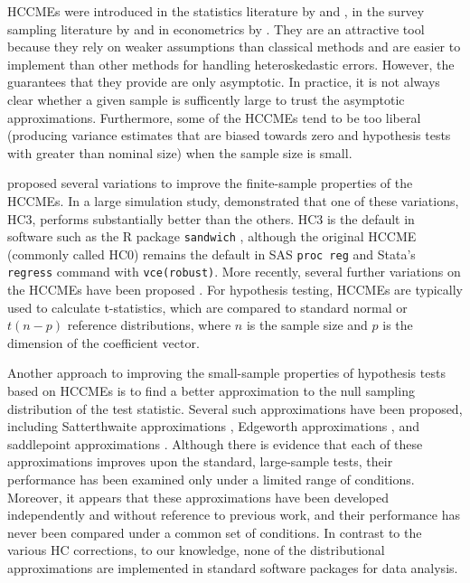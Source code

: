 \documentclass[12pt]{article}\usepackage[]{graphicx}\usepackage[]{color}
\begin{document}
HCCMEs were introduced in the statistics literature by \citet{Huber1967behavior} and \citet{Eicker1967limit}, in the survey sampling literature by and in econometrics by \citet{White1980heteroskedasticity}. They are an attractive tool because they rely on weaker assumptions than classical methods and are easier to implement than other methods for handling heteroskedastic errors. However, the guarantees that they provide are only asymptotic. In practice, it is not always clear whether a given sample is sufficently large to trust the asymptotic approximations. Furthermore, some of the HCCMEs tend to be too liberal (producing variance estimates that are biased towards zero and hypothesis tests with greater than nominal size) when the sample size is small. 

\citet{MacKinnon1985some} proposed several variations to improve the finite-sample properties of the HCCMEs. 
In a large simulation study, \citet{Long2000using} demonstrated that one of these variations, HC3, performs substantially better than the others.
HC3 is the default in software such as the R package \texttt{sandwich} \citep{Zeileis2004econometric}, although the original HCCME (commonly called HC0) remains the default in SAS \texttt{proc reg} and Stata's \texttt{regress} command with \texttt{vce(robust)}. 
More recently, several further variations on the HCCMEs have been proposed \citep{Cribari-Neto2004asymptotic, Cribari-Neto2007inference, Cribari-Neto2011new}. 
For hypothesis testing, HCCMEs are typically used to calculate t-statistics, which are compared to standard normal or $t(n - p)$ reference distributions, where $n$ is the sample size and $p$ is the dimension of the coefficient vector. 

Another approach to improving the small-sample properties of hypothesis tests based on HCCMEs is to find a better approximation to the null sampling distribution of the test statistic. 
Several such approximations have been proposed, including Satterthwaite approximations \citep{Lipsitz1999degrees}, Edgeworth approximations \citep{Rothenberg1988approximate, Kauermann2001note}, and saddlepoint approximations \citep{McCaffrey2006improved}. 
Although there is evidence that each of these approximations improves upon the standard, large-sample tests, their performance has been examined only under a limited range of conditions. 
Moreover, it appears that these approximations have been developed independently and without reference to previous work, and their performance has never been compared under a common set of conditions. 
In contrast to the various HC corrections, to our knowledge, none of the distributional approximations are implemented in standard software packages for data analysis. 
\end{document}

